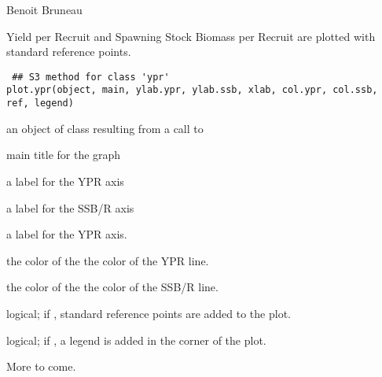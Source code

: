\documentclass[a4paper]{book}
\begin{document}
%
\begin{Author}\relax
Benoit Bruneau
\end{Author}
\newpage
{}
%
\begin{Description}\relax
Yield per Recruit and Spawning Stock Biomass per Recruit are plotted with standard reference points. 
\end{Description}
%
\begin{Usage}
\begin{verbatim}
 ## S3 method for class 'ypr'
plot.ypr(object, main, ylab.ypr, ylab.ssb, xlab, col.ypr, col.ssb, ref, legend)
\end{verbatim}
\end{Usage}
%
\begin{Arguments}
\begin{ldescription}
\item[\code{object}] an object of class  resulting from a
call to 

\item[\code{main}] main title for the graph

\item[\code{ylab.ypr}] a label for the YPR  axis

\item[\code{ylab.ssb}] a label for the SSB/R  axis

\item[\code{xlab}] a label for the YPR  axis.

\item[\code{col.ypr}] the color of the the color of the YPR line.

\item[\code{col.ssb}] the color of the the color of the SSB/R line.

\item[\code{ref}] logical; if , standard reference points are added to the plot.

\item[\code{legend}] logical; if , a legend is added in the  corner of the plot.

\end{ldescription}
\end{Arguments}
%
\begin{Details}\relax
More to come.
\end{Details}
%
\begin{SeeAlso}\relax
{}
\end{SeeAlso}
\end{document}
